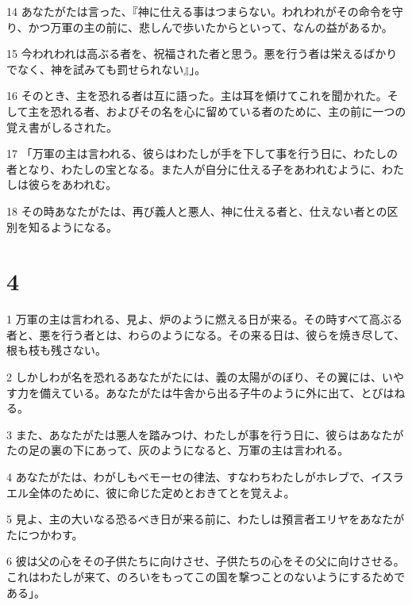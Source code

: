 \par 14 あなたがたは言った、『神に仕える事はつまらない。われわれがその命令を守り、かつ万軍の主の前に、悲しんで歩いたからといって、なんの益があるか。
\par 15 今われわれは高ぶる者を、祝福された者と思う。悪を行う者は栄えるばかりでなく、神を試みても罰せられない』」。
\par 16 そのとき、主を恐れる者は互に語った。主は耳を傾けてこれを聞かれた。そして主を恐れる者、およびその名を心に留めている者のために、主の前に一つの覚え書がしるされた。
\par 17 「万軍の主は言われる、彼らはわたしが手を下して事を行う日に、わたしの者となり、わたしの宝となる。また人が自分に仕える子をあわれむように、わたしは彼らをあわれむ。
\par 18 その時あなたがたは、再び義人と悪人、神に仕える者と、仕えない者との区別を知るようになる。

\chapter{4}

\par 1 万軍の主は言われる、見よ、炉のように燃える日が来る。その時すべて高ぶる者と、悪を行う者とは、わらのようになる。その来る日は、彼らを焼き尽して、根も枝も残さない。
\par 2 しかしわが名を恐れるあなたがたには、義の太陽がのぼり、その翼には、いやす力を備えている。あなたがたは牛舎から出る子牛のように外に出て、とびはねる。
\par 3 また、あなたがたは悪人を踏みつけ、わたしが事を行う日に、彼らはあなたがたの足の裏の下にあって、灰のようになると、万軍の主は言われる。
\par 4 あなたがたは、わがしもべモーセの律法、すなわちわたしがホレブで、イスラエル全体のために、彼に命じた定めとおきてとを覚えよ。
\par 5 見よ、主の大いなる恐るべき日が来る前に、わたしは預言者エリヤをあなたがたにつかわす。
\par 6 彼は父の心をその子供たちに向けさせ、子供たちの心をその父に向けさせる。これはわたしが来て、のろいをもってこの国を撃つことのないようにするためである」。


